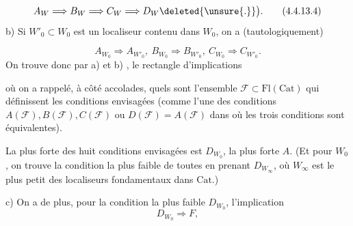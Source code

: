 
\[
 A_W\Longrightarrow B_W\Longrightarrow C_W\Longrightarrow D_W\deleted{\unsure{.}}\big).\tag*{(4.4.13.4)}
\]
b) Si $W'_0\subset W_0$ est un localiseur  contenu dans $W_0$, on a (tautologiquement)

\[
 A_{W_0}\Rightarrow A_{W'_0},\ B_{W_0}\Rightarrow B_{W'_0},\ C_{W_0}\Rightarrow C_{W'_0}.
\]
On  trouve donc par a) et b) , le rectangle d'implications


où on a  rappelé, à côté  accolades, quels sont  l'ensemble $\mathcal F\subset\mathrm{Fl}(\mathrm{Cat})$ qui définissent les conditions envisagées  (comme l'une des conditions $A(\mathcal F), B(\mathcal F), C(\mathcal F)$ ou $D(\mathcal F)=A(\mathcal F)$ dans  où les trois conditions sont équivalentes).

La plus forte des huit conditions envisagées est $D_{W_0}$, la plus forte $A$.  (Et pour $W_0$ , on trouve la condition la plus faible de toutes en prenant $D_{W_\infty}$, où $W_\infty$ est le plus petit des localiseurs fondamentaux dans $\mathrm{Cat}$.)


c) On a de plus, pour la condition la plus faible $D_{W_0}$, l'implication
\[
 D_{W_0}\Longrightarrow F,
\]
